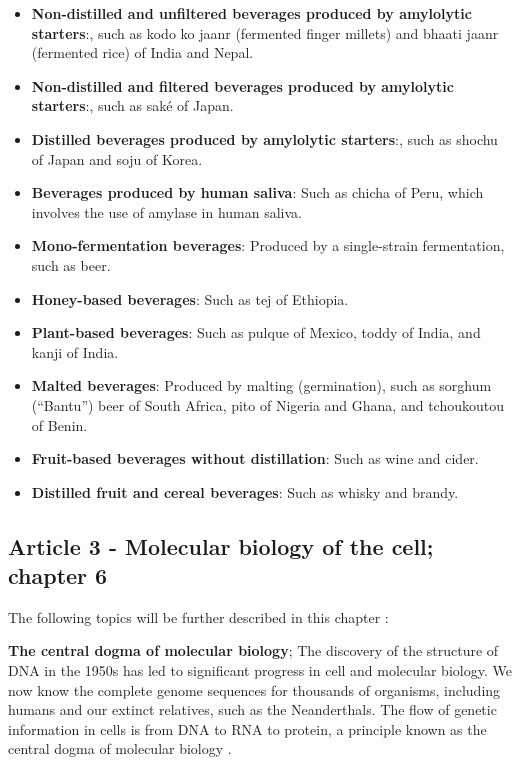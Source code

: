 \begin{itemize}
    \item \textbf{Non-distilled and unfiltered beverages produced by amylolytic starters}:, such as kodo ko jaanr (fermented finger millets) and bhaati jaanr (fermented rice) of India and Nepal.
    \item \textbf{Non-distilled and filtered beverages produced by amylolytic starters}:, such as saké of Japan.
    \item \textbf{Distilled beverages produced by amylolytic starters}:, such as shochu of Japan and soju of Korea.
    \item \textbf{Beverages produced by human saliva}: Such as chicha of Peru, which involves the use of amylase in human saliva.
    \item \textbf{Mono-fermentation beverages}: Produced by a single-strain fermentation, such as beer.
    \item \textbf{Honey-based beverages}: Such as tej of Ethiopia.
    \item \textbf{Plant-based beverages}: Such as pulque of Mexico, toddy of India, and kanji of India.
    \item \textbf{Malted beverages}: Produced by malting (germination), such as sorghum (“Bantu”) beer of South Africa, pito of Nigeria and Ghana, and tchoukoutou of Benin.
    \item \textbf{Fruit-based beverages without distillation}: Such as wine and cider.
    \item \textbf{Distilled fruit and cereal beverages}: Such as whisky and brandy.
\end{itemize}


\subsection{Article 3 - Molecular biology of the cell; chapter 6}

The following topics will be further described in this chapter \cite*{L1-Chapter6}:

\textbf{The central dogma of molecular biology};
The discovery of the structure of DNA in the 1950s has led to significant progress in cell and molecular biology. We now know the complete genome sequences for thousands of organisms, including humans and our extinct relatives, such as the Neanderthals. The flow of genetic information in cells is from DNA to RNA to protein, a principle known as the central dogma of molecular biology \cite*{L1-Chapter6}.

